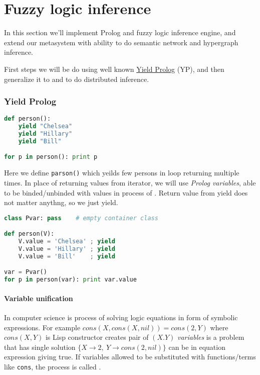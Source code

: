 \part{Fuzzy logic inference}

In this section we'll implement Prolog and fuzzy logic inference engine, and
extend our metasystem with ability to do semantic network and hypergraph
inference.

First steps we will be do using well known
\href{http://yieldprolog.sourceforge.net/}{Yield Prolog} (YP), and then
generalize it to  and  to do
distributed inference.

\section{Yield Prolog}

\begin{lstlisting}[language=Python]
def person():
    yield "Chelsea"
    yield "Hillary"
    yield "Bill"

for p in person(): print p
\end{lstlisting}
Here we define \verb|parson()|  which yeilds few
persons in loop returning  multiple times. In place of
returning values from iterator, we will use \emph{Prolog variables}, able to be
binded/unbinded with values in process of . Return value from
yield does not matter anythng, so we just yield.

\begin{lstlisting}[language=Python]
class Pvar: pass    # empty container class

def person(V):
    V.value = 'Chelsea' ; yield
    V.value = 'Hillary' ; yield
    V.value = 'Bill'	; yield

var = Pvar()
for p in person(var): print var.value
\end{lstlisting}

\subsection{Variable unification}

In computer science  is process of solving logic equations in
form of symbolic expressions. For example $cons(X,cons(X,nil)) = cons(2,Y)$
where $cons(X,Y)$ is Lisp constructor creates pair of $(X.Y)$ \emph{variables}
is a  problem that has single solution
$\{X\rightarrow 2,\ Y\rightarrow cons(2,nil)\}$ can be  in
equation expression giving true. If variables allowed to be substituted with
functions/terms like \verb|cons|, the process is called .


